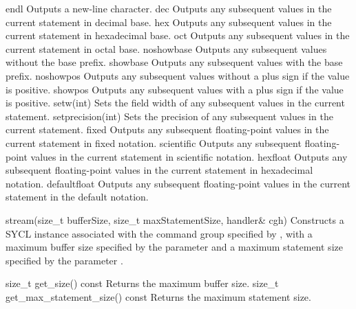 \addRow
{
  endl
}
{
  Outputs a new-line character.
}
\addRow
{
  dec
}
{
  Outputs any subsequent values in the current statement in decimal base.
}
\addRow
{
  hex
}
{
  Outputs any subsequent values in the current statement in hexadecimal base.
}
\addRow
{
  oct
}
{
  Outputs any subsequent values in the current statement in octal base.
}
\addRow
{
  noshowbase
}
{
  Outputs any subsequent values without the base prefix.
}
\addRow
{
  showbase
}
{
  Outputs any subsequent values with the base prefix.
}
\addRow
{
  noshowpos
}
{
  Outputs any subsequent values without a plus sign if the value is positive.
}
\addRow
{
  showpos
}
{
  Outputs any subsequent values with a plus sign if the value is positive.
}
\addRow
{
  setw(int)
}
{
  Sets the field width of any subsequent values in the current statement.
}
\addRow
{
  setprecision(int)
}
{
  Sets the precision of any subsequent values in the current statement.
}
\addRow
{
  fixed
}
{
  Outputs any subsequent floating-point values in the current statement in fixed notation.
}
\addRow
{
  scientific
}
{
  Outputs any subsequent floating-point values in the current statement in scientific notation.
}
\addRow
{
  hexfloat
}
{
  Outputs any subsequent floating-point values in the current statement in hexadecimal notation.
}
\addRow
{
  defaultfloat
}
{
  Outputs any subsequent floating-point values in the current statement in the default notation.
}
\completeTable

  \addRow
    {stream(size_t bufferSize, size_t maxStatementSize, handler\& cgh)}
    {
      Constructs a SYCL  instance associated with the command group specified by , with a maximum buffer size specified by the parameter  and a maximum statement size specified by the parameter .
    }
\completeTable

  \addRow
    {size_t get_size() const}
    {
      Returns the maximum buffer size.
    }
  \addRow
    {size_t get_max_statement_size() const}
    {
      Returns the maximum statement size.
    }
\completeTable

